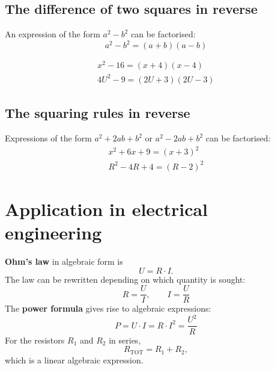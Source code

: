 \subsection{The difference of two squares in reverse}
\label{c2:sec:konjbakat}
An expression of the form $a^2 - b^2$ can be factorised:
\[
  a^2 - b^2 = (a + b)(a - b)
\]

\begin{exempel}
\begin{gather*}
  x^2 - 16 = (x + 4)(x - 4) \\
  4U^2 - 9 = (2U + 3)(2U - 3)
\end{gather*}
\end{exempel}

\subsection{The squaring rules in reverse}
\label{c2:sec:kvbakat}
Expressions of the form $a^2 + 2ab + b^2$ or $a^2 - 2ab + b^2$ can be factorised:
\begin{gather*}
  x^2 + 6x + 9 = (x + 3)^2 \\
  R^2 - 4R + 4 = (R - 2)^2
\end{gather*}

\section{Application in electrical engineering}
\label{c2:sec:tillampning}
\textbf{Ohm's law} in algebraic form is
\[
  U = R \cdot I.
\]
The law can be rewritten depending on which quantity is sought:
\[
  R = \frac{U}{I}, \qquad I = \frac{U}{R}
\]
The \textbf{power formula} gives rise to algebraic expressions:
\[
  P = U \cdot I = R \cdot I^2 = \frac{U^2}{R}
\]
For the resistors $R_1$ and $R_2$ in series,
\[
  R_{\text{TOT}} = R_1 + R_2,
\]
which is a linear algebraic expression.
